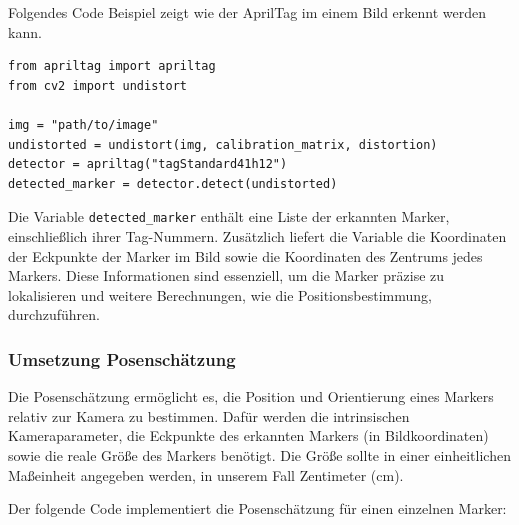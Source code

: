 Folgendes Code Beispiel zeigt wie der AprilTag im einem Bild erkennt werden kann.


\begin{lstlisting}
from apriltag import apriltag
from cv2 import undistort

img = "path/to/image"
undistorted = undistort(img, calibration_matrix, distortion)
detector = apriltag("tagStandard41h12")
detected_marker = detector.detect(undistorted)
\end{lstlisting}


Die Variable \texttt{detected\_marker} enthält eine Liste der erkannten Marker, einschließlich ihrer Tag-Nummern.
Zusätzlich liefert die Variable die Koordinaten der Eckpunkte der Marker im Bild sowie 
die Koordinaten des Zentrums jedes Markers. Diese Informationen sind essenziell, um die Marker 
präzise zu lokalisieren und weitere Berechnungen, wie die Positionsbestimmung, durchzuführen.



\subsubsection{Umsetzung Posenschätzung}
Die Posenschätzung ermöglicht es, die Position und Orientierung eines Markers relativ zur Kamera
zu bestimmen. Dafür werden die intrinsischen Kameraparameter, die Eckpunkte des erkannten 
Markers (in Bildkoordinaten) sowie die reale Größe des Markers benötigt. Die Größe sollte 
in einer einheitlichen Maßeinheit angegeben werden, in unserem Fall Zentimeter (cm).

Der folgende Code implementiert die Posenschätzung für einen einzelnen Marker:



